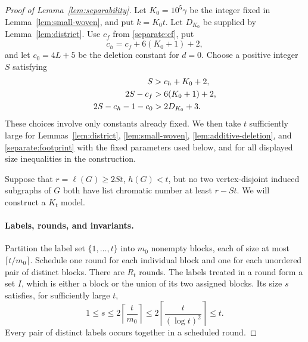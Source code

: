 \begin{proof}[Proof of Lemma~\ref{lem:separability}]
Let \(K_0=10^5\gamma\) be the integer fixed in
Lemma~\ref{lem:small-woven}, and put \(k=K_0t\).
Let \(D_{K_0}\) be supplied by Lemma~\ref{lem:district}.
Use \(c_f\) from \eqref{separate:cf}, put
\begin{equation}
 \label{separate:ch}
 c_h=c_f+6(K_0+1)+2,
\end{equation}
and let \(c_0=4L+5\) be the deletion constant for \(d=0\).
Choose a positive integer \(S\) satisfying
\begin{align}
 \label{separate:S}
 S&>c_h+K_0+2,\notag\\
 2S-c_f&>6(K_0+1)+2,\\
 2S-c_h-1-c_0&>2D_{K_0}+3.\notag
\end{align}
These choices involve only constants already fixed. We then take
\(t\) sufficiently large for Lemmas~\ref{lem:district},
\ref{lem:small-woven}, \ref{lem:additive-deletion}, and
\ref{separate:footprint} with the fixed parameters used below,
and for all displayed size inequalities in the construction.

Suppose that \(r=\ell(G)\ge2St\), \(h(G)<t\), but no two
vertex-disjoint induced subgraphs of \(G\) both have list chromatic
number at least \(r-St\). We will construct a \(K_t\) model.

\paragraph{Labels, rounds, and invariants.}
Partition the label set \(\{1,\ldots,t\}\) into \(m_0\) nonempty
blocks, each of size at most \(\lceil t/m_0\rceil\).
Schedule one round for each individual block and one for each
unordered pair of distinct blocks. There are \(R_t\) rounds.
The labels treated in a round form a set \(I\), which is either
a block or the union of its two assigned blocks. Its size \(s\)
satisfies, for sufficiently large \(t\),
\begin{equation}
 \label{separate:s}
 1\le s\le2\left\lceil\frac{t}{m_0}\right\rceil
 \le2\left\lceil\frac{t}{(\log t)^2}\right\rceil
 \le t.
\end{equation}
Every pair of distinct labels occurs together in a scheduled round.


\end{proof}
